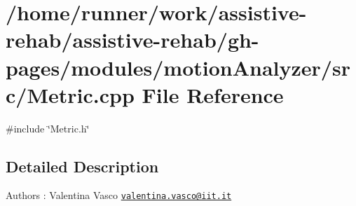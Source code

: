 \section{/home/runner/work/assistive-\/rehab/assistive-\/rehab/gh-\/pages/modules/motion\+Analyzer/src/\+Metric.cpp File Reference}
\label{Metric_8cpp}
{\ttfamily \#include \char`\"{}Metric.\+h\char`\"{}}\newline


\subsection{Detailed Description}
\begin{DoxyAuthor}{Authors}
\+: Valentina Vasco \href{mailto:valentina.vasco@iit.it}{\tt valentina.\+vasco@iit.\+it} 
\end{DoxyAuthor}
